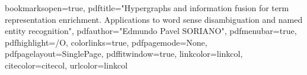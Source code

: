 
\hypersetup
{
bookmarksopen=true,
pdftitle="Hypergraphs and information fusion for term representation enrichment. Applications to word sense disambiguation and named entity recognition",
pdfauthor="Edmundo Pavel SORIANO", 
pdfmenubar=true, %
pdfhighlight=/O, %
colorlinks=true, %
pdfpagemode=None, %
pdfpagelayout=SinglePage, %
pdffitwindow=true, %
linkcolor=linkcol, %
citecolor=citecol, %
urlcolor=linkcol %
}
\usepackage[linesnumbered,ruled,vlined]{algorithm2e}


\setcounter{secnumdepth}{3}
\setcounter{tocdepth}{2}


\newcommand{\pd}[2]{\frac{\partial #1}{\partial #2}}
\def\abs{\operatorname{abs}}
\def\argmax{\operatornamewithlimits{arg\,max}}
\def\argmin{\operatornamewithlimits{arg\,min}}
\def\diag{\operatorname{Diag}}
\newcommand{\eqRef}[1]{(\ref{#1})}

\usepackage{rotating}                    %
\usepackage{fancyhdr}                    %

  

